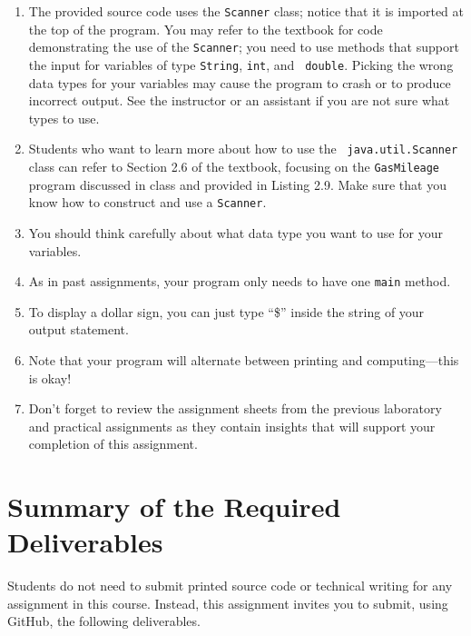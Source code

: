 \documentclass[11pt]{article}
\begin{document}
\begin{enumerate}
  \setlength{\itemsep}{0pt}

\item The provided source code uses the {\tt Scanner} class; notice that it is
  imported at the top of the program. You may refer to the textbook for code
  demonstrating the use of the {\tt Scanner}; you need to use methods that
  support the input for variables of type {\tt String}, {\tt int}, and {\tt
  double}. Picking the wrong data types for your variables may cause the program
  to crash or to produce incorrect output. See the instructor or an assistant if
  you are not sure what types to use.

\item Students who want to learn more about how to use the {\tt
  java.util.Scanner} class can refer to Section 2.6 of the textbook, focusing on
  the {\tt GasMileage} program discussed in class and provided in Listing 2.9.
  Make sure that you know how to construct and use a {\tt Scanner}.

\item You should think carefully about what data type you want to use for your
  variables.

\item As in past assignments, your program only needs to have one {\tt main}
  method.

\item To display a dollar sign, you can just type ``\$'' inside the string of
  your output statement.

\item Note that your program will alternate between printing and
  computing---this is okay!

\item Don't forget to review the assignment sheets from the previous laboratory
  and practical assignments as they contain insights that will support your
  completion of this assignment.

\end{enumerate}

\section*{Summary of the Required Deliverables}

\noindent Students do not need to submit printed source code or technical
writing for any assignment in this course. Instead, this assignment invites you
to submit, using GitHub, the following deliverables.
\end{document}
